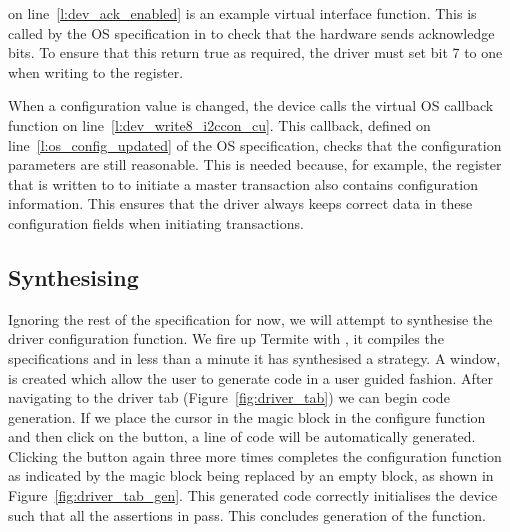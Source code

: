  on line~\ref{l:dev_ack_enabled} is an example virtual interface function. This is called by the OS specification in  to check that the hardware sends acknowledge bits. To ensure that this return true as required, the driver must set bit 7 to one when writing to the  register.

When a configuration value is changed, the device calls the virtual OS callback function  on line~\ref{l:dev_write8_i2ccon_cu}. This callback, defined on line~\ref{l:os_config_updated} of the OS specification, checks that the configuration parameters are still reasonable. This is needed because, for example, the register that is written to to initiate a master transaction also contains configuration information. This ensures that the driver always keeps correct data in these configuration fields when initiating transactions.

\subsection{Synthesising}
Ignoring the rest of the specification for now, we will attempt to synthesise the driver configuration function. We fire up Termite with , it compiles the specifications and in less than a minute it has synthesised a strategy. A window, is created which allow the user to generate code in a user guided fashion. After navigating to the driver tab (Figure~\ref{fig:driver_tab}) we can begin code generation. If we place the cursor in the magic block in the configure function and then click on the  button, a line of code will be automatically generated. Clicking the  button again three more times completes the configuration function as indicated by the magic block being replaced by an empty block, as shown in Figure~\ref{fig:driver_tab_gen}. This generated code correctly initialises the device such that all the assertions in  pass. This concludes generation of the  function.

